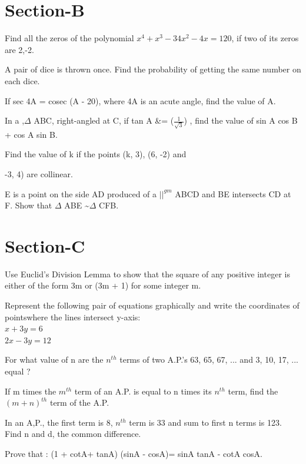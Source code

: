 \documentclass[journal,12pt,twocolumn]{IEEEtran}
\begin{document}
\begin{enumerate}
\section{Section-B}
\item Find all the zeros of the polynomial $x^4+x^3-34x^2-4x=120$, if two of its zeros are 2,-2.\\
\item A pair of dice is thrown once. Find the probability of getting the same number on each dice. \\
\item If sec 4A = cosec (A - 20\textdegree), where 4A is an acute angle, find the value of A.
{\centering

    \caption{\textbf{}\\ }
                        }
In a ,$\Delta$ ABC, right-angled at C, if tan A &= ($\frac{1}{\sqrt{3}}$) , find the value of
sin A cos B + cos A sin B.
\item Find the value of k if the points (k, 3), (6, -2) and {-3, 4) are collinear.\\
\item E is a point on the side AD produced of a $||^{gm}$ ABCD and BE intersects CD at F. Show that $\Delta$ ABE \sim $\Delta$ CFB.
\section{Section-C}
\item Use Euclid's Division Lemma to show that the square of any positive integer is either of the form 3m or (3m + 1) for some integer m.\\ 
\item Represent the following pair of equations graphically and write the coordinates of pointswhere the lines intersect y-axis:\\
$x+3y=6$ \\
$2x-3y=12$ \\
\item For what value of n are the $n^{th}$ terms of two A.P.'s 63, 65, 67, ... and 3, 10, 17, ... equal ?\\
{\centering

    \caption{\textbf{}\\ }
                        }
If m times the $m^{th}$ term of an A.P. is equal to n times its $n^{th}$ term, find the $(m+n)^{th}$ term of the A.P.
\item In an A,P., the first term is 8, $n^{th}$ term is 33 and sum to first n terms is 123. Find n and d, the common difference.\\
\item Prove that :
(1 + cotA+ tanA) (sinA - cosA)= sinA tanA - cotA cosA.\\
{\centering

}}
\end{enumerate}
\end{document}
